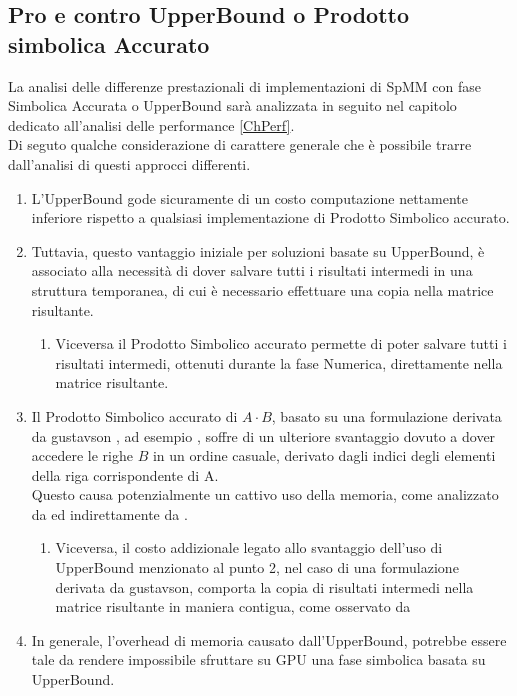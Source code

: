 \subsection{Pro e contro UpperBound o Prodotto simbolica Accurato} \label{chSpMMSymb:UB_VS_SYMBACC}
La analisi delle differenze prestazionali di implementazioni di SpMM con fase Simbolica Accurata o UpperBound
sarà analizzata in seguito nel capitolo dedicato all'analisi delle performance \ref{ChPerf}.\\
Di seguto qualche considerazione di carattere generale che è possibile trarre dall'analisi di questi approcci differenti.\\
\begin{enumerate}
	\item L'UpperBound gode sicuramente di un costo computazione nettamente inferiore 
	      rispetto a qualsiasi implementazione di Prodotto Simbolico accurato.\\
	\item Tuttavia, questo vantaggio iniziale per soluzioni basate su UpperBound, 
		  è associato alla necessità di dover salvare tutti i risultati intermedi in una struttura temporanea,
		  di cui è necessario effettuare una copia nella matrice risultante.
	\begin{enumerate}
		\item Viceversa il Prodotto Simbolico accurato permette di poter salvare tutti i risultati intermedi,
			  ottenuti durante la fase Numerica, direttamente nella matrice risultante.
	\end{enumerate}
	\item Il Prodotto Simbolico  accurato di $A \cdot B$, 
		  basato su una formulazione derivata da gustavson \cite{gustavson}, ad esempio \rowbyrow,
		  soffre di un ulteriore svantaggio dovuto a dover accedere le righe $B$ in un ordine casuale, derivato 
		  dagli indici degli elementi \nnz della riga corrispondente di A.\\
		  Questo causa potenzialmente un cattivo uso della memoria, come analizzato da 
		  \cite{Sp3MM_for_AMG} ed indirettamente da \cite{ESC}.
	\begin{enumerate}
		\label{chSpMMSymb:UB_VS_SYMBACC_rowbyrowContiguousCopyBack}
		\item Viceversa, il costo addizionale legato allo svantaggio dell'uso di UpperBound menzionato al punto 2,
			  nel caso di una formulazione derivata da gustavson, comporta la copia di risultati intermedi 
			  nella matrice risultante in maniera contigua, come osservato da \cite{Sp3MM_for_AMG}
	\end{enumerate}
	\item In generale, l'overhead di memoria causato dall'UpperBound, potrebbe essere tale da rendere impossibile 
		  sfruttare su GPU una fase simbolica basata su UpperBound. %
\end{enumerate}
